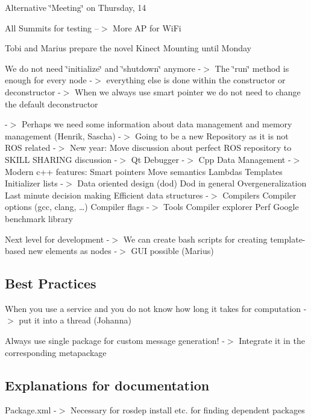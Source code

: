 \begin{DoxyEnumerate}
\item Alternative \char`\"{}\+Meeting\char`\"{} on Thursday, 14
\begin{DoxyEnumerate}
\item All Summits for testing --$>$ More AP for Wi\+Fi
\end{DoxyEnumerate}
\begin{DoxyEnumerate}
\item Tobi and Marius prepare the novel Kinect Mounting until Monday
\end{DoxyEnumerate}
\end{DoxyEnumerate}
\begin{DoxyEnumerate}
\item We do not need \char`\"{}initialize\char`\"{} and \char`\"{}shutdown\char`\"{} anymore -\/$>$ The \char`\"{}run\char`\"{} method is enough for every node -\/$>$ everything else is done within the constructor or deconstructor -\/$>$ When we always use smart pointer we do not need to change the default deconstructor

-\/$>$ Perhaps we need some information about data management and memory management (Henrik, Sascha) -\/$>$ Going to be a new Repository as it is not R\+OS related -\/$>$ New year\+: Move discussion about perfect R\+OS repository to S\+K\+I\+LL S\+H\+A\+R\+I\+NG discussion -\/$>$ Qt Debugger -\/$>$ Cpp Data Management -\/$>$ Modern c++ features\+: Smart pointers Move semantics Lambdas Templates Initializer lists -\/$>$ Data oriented design (dod) Dod in general Overgeneralization Last minute decision making Efficient data structures -\/$>$ Compilers Compiler options (gcc, clang, …) Compiler flags -\/$>$ Tools Compiler explorer Perf Google benchmark library
\end{DoxyEnumerate}
\begin{DoxyEnumerate}
\item Next level for development -\/$>$ We can create bash scripts for creating template-\/based new elements as nodes -\/$>$ G\+UI possible (Marius) 


\end{DoxyEnumerate}

\subsection*{Best Practices}


\begin{DoxyEnumerate}
\item When you use a service and you do not know how long it takes for computation -\/$>$ put it into a thread (Johanna)
\end{DoxyEnumerate}
\begin{DoxyEnumerate}
\item Always use single package for custom message generation! -\/$>$ Integrate it in the corresponding metapackage 


\end{DoxyEnumerate}

\subsection*{Explanations for documentation}


\begin{DoxyItemize}
\item Package.\+xml -\/$>$ Necessary for rosdep install etc. for finding dependent packages 
\end{DoxyItemize}